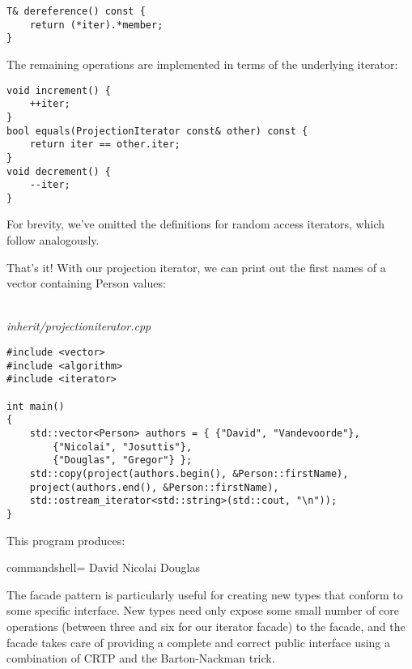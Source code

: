 \begin{lstlisting}[style=styleCXX]
T& dereference() const {
	return (*iter).*member;
}
\end{lstlisting}

The remaining operations are implemented in terms of the underlying iterator:

\begin{lstlisting}[style=styleCXX]
void increment() {
	++iter;
}
bool equals(ProjectionIterator const& other) const {
	return iter == other.iter;
}
void decrement() {
	--iter;
}
\end{lstlisting}

For brevity, we’ve omitted the definitions for random access iterators, which follow analogously.

That’s it! With our projection iterator, we can print out the first names of a vector containing Person values:

\hspace*{\fill} \\ %
\noindent
\textit{inherit/projectioniterator.cpp}
\begin{lstlisting}[style=styleCXX]
#include <vector>
#include <algorithm>
#include <iterator>

int main()
{
	std::vector<Person> authors = { {"David", "Vandevoorde"},
		{"Nicolai", "Josuttis"},
		{"Douglas", "Gregor"} };
	std::copy(project(authors.begin(), &Person::firstName),
	project(authors.end(), &Person::firstName),
	std::ostream_iterator<std::string>(std::cout, "\n"));
}
\end{lstlisting}

This program produces:

\begin{tcblisting}{commandshell={}}
David
Nicolai
Douglas
\end{tcblisting}

The facade pattern is particularly useful for creating new types that conform to some specific interface. New types need only expose some small number of core operations (between three and six for our iterator facade) to the facade, and the facade takes care of providing a complete and correct public interface using a combination of CRTP and the Barton-Nackman trick.












